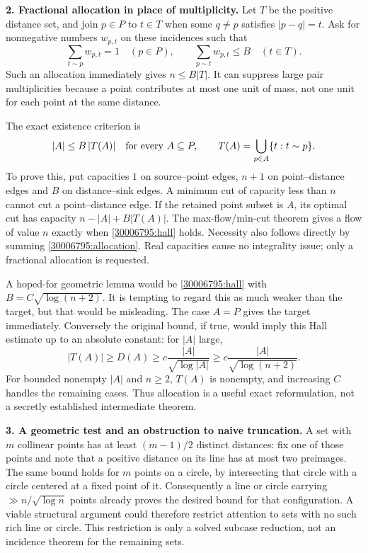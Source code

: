 \documentclass[11pt,a4paper]{article}
\numberwithin{equation}{section}
\begin{document}
\textbf{2. Fractional allocation in place of multiplicity.}
Let $T$ be the positive distance set, and join $p\in P$ to $t\in T$
when some $q\ne p$ satisfies $|p-q|=t$. Ask for nonnegative numbers
$w_{p,t}$ on these incidences such that
\begin{equation}\label{30006795:allocation}
 \sum_{t\sim p}w_{p,t}=1\quad(p\in P),\qquad
 \sum_{p\sim t}w_{p,t}\le B\quad(t\in T).
\end{equation}
Such an allocation immediately gives $n\le B|T|$. It can suppress large
pair multiplicities because a point contributes at most one unit of mass,
not one unit for each point at the same distance.

The exact existence criterion is
\begin{equation}\label{30006795:hall}
 |A|\le B\,|T(A)|\quad\hbox{for every }A\subseteq P,
 \qquad T(A)=\bigcup_{p\in A}\{t:t\sim p\}.
\end{equation}
To prove this, put capacities $1$ on source--point edges, $n+1$ on
point--distance edges and $B$ on distance--sink edges. A minimum cut of
capacity less than $n$ cannot cut a point--distance edge. If the retained
point subset is $A$, its optimal cut has capacity
$n-|A|+B|T(A)|$. The max-flow/min-cut theorem gives a flow of value $n$
exactly when \eqref{30006795:hall} holds. Necessity also follows directly by
summing \eqref{30006795:allocation}. Real capacities cause no integrality
issue; only a fractional allocation is requested.

A hoped-for geometric lemma would be \eqref{30006795:hall} with
$B=C\sqrt{\log(n+2)}$. It is tempting to regard this as much weaker than
the target, but that would be misleading. The case $A=P$ gives the target
immediately. Conversely the original bound, if true, would imply this
Hall estimate up to an absolute constant: for $|A|$ large,
\[
 |T(A)|\ge D(A)\ge c\frac{|A|}{\sqrt{\log |A|}}
            \ge c\frac{|A|}{\sqrt{\log(n+2)}}.
\]
For bounded nonempty $|A|$ and $n\ge2$, $T(A)$ is nonempty, and increasing
$C$ handles the remaining cases. Thus allocation is a useful exact
reformulation, not a secretly established intermediate theorem.

\textbf{3. A geometric test and an obstruction to naive truncation.}
A set with $m$ collinear points has at least $(m-1)/2$ distinct distances:
fix one of those points and note that a positive distance on its line has
at most two preimages. The same bound holds for $m$ points on a circle,
by intersecting that circle with a circle centered at a fixed point of it.
Consequently a line or circle carrying
$\gg n/\sqrt{\log n}$ points already proves the desired bound for that
configuration. A viable structural argument could therefore restrict
attention to sets with no such rich line or circle. This restriction is
only a solved subcase reduction, not an incidence theorem for the
remaining sets.
\end{document}
